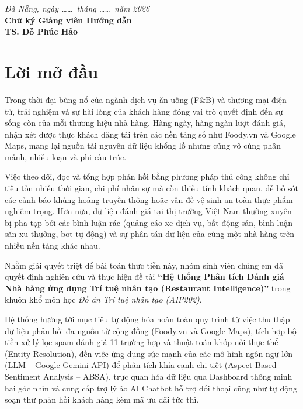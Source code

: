 \documentclass[12pt, a4paper]{article}
\begin{document}
\vspace{0.8cm}
\begin{flushright}
\textit{Đà Nẵng, ngày \dots\dots\ tháng \dots\dots\ năm 2026}\\
\textbf{Chữ ký Giảng viên Hướng dẫn}\\[1.8cm]
\textbf{TS. Đỗ Phúc Hảo}
\end{flushright}

\newpage
\section*{Lời mở đầu}

Trong thời đại bùng nổ của ngành dịch vụ ăn uống (F\&B) và thương mại điện tử, trải nghiệm và sự hài lòng của khách hàng đóng vai trò quyết định đến sự sống còn của mỗi thương hiệu nhà hàng. Hàng ngày, hàng ngàn lượt đánh giá, nhận xét được thực khách đăng tải trên các nền tảng số như Foody.vn và Google Maps, mang lại nguồn tài nguyên dữ liệu khổng lồ nhưng cũng vô cùng phân mảnh, nhiễu loạn và phi cấu trúc.

Việc theo dõi, đọc và tổng hợp phản hồi bằng phương pháp thủ công không chỉ tiêu tốn nhiều thời gian, chi phí nhân sự mà còn thiếu tính khách quan, dễ bỏ sót các cảnh báo khủng hoảng truyền thông hoặc vấn đề vệ sinh an toàn thực phẩm nghiêm trọng. Hơn nữa, dữ liệu đánh giá tại thị trường Việt Nam thường xuyên bị pha tạp bởi các bình luận rác (quảng cáo xe dịch vụ, bất động sản, bình luận săn xu thưởng, bot tự động) và sự phân tán dữ liệu của cùng một nhà hàng trên nhiều nền tảng khác nhau.

Nhằm giải quyết triệt để bài toán thực tiễn này, nhóm sinh viên chúng em đã quyết định nghiên cứu và thực hiện đề tài \textbf{``Hệ thống Phân tích Đánh giá Nhà hàng ứng dụng Trí tuệ nhân tạo (Restaurant Intelligence)''} trong khuôn khổ môn học \textit{Đồ án Trí tuệ nhân tạo (AIP202)}.

Hệ thống hướng tới mục tiêu tự động hóa hoàn toàn quy trình từ việc thu thập dữ liệu phản hồi đa nguồn từ cộng đồng (Foody.vn và Google Maps), tích hợp bộ tiền xử lý lọc spam đánh giá 11 trường hợp và thuật toán khớp nối thực thể (Entity Resolution), đến việc ứng dụng sức mạnh của các mô hình ngôn ngữ lớn (LLM -- Google Gemini API) để phân tích khía cạnh chi tiết (Aspect-Based Sentiment Analysis -- ABSA), trực quan hóa dữ liệu qua Dashboard thông minh hai góc nhìn và cung cấp trợ lý ảo AI Chatbot hỗ trợ đối thoại cũng như tự động soạn thư phản hồi khách hàng kèm mã ưu đãi tức thì.
\end{document}
